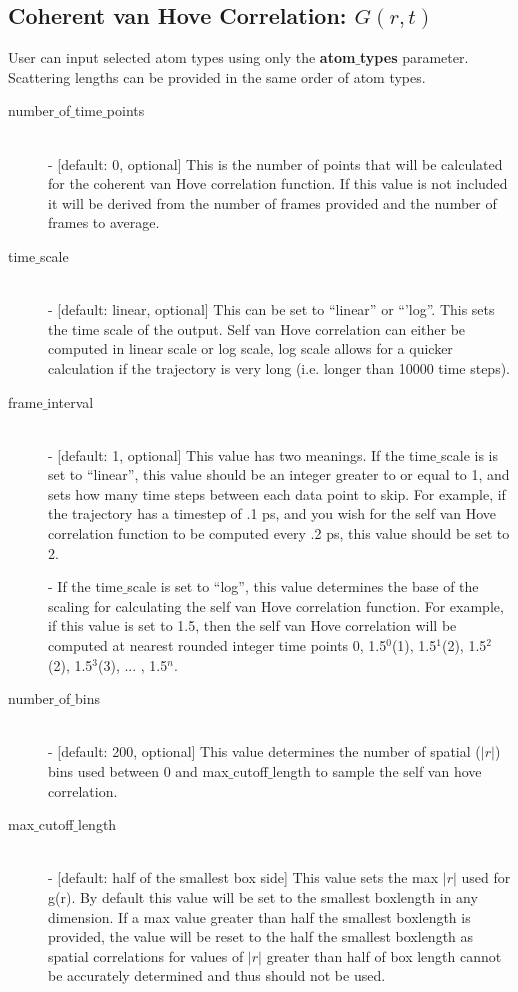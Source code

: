\documentclass{article}
\begin{document}
\subsection{Coherent van Hove Correlation: $G(r,t)$} \label{sec::Grt_parm}
User can input selected atom types using only the \textbf{atom$\_$types} parameter. Scattering lengths can be provided in the same order of atom types.
\begin{description}	
	\item[number$\_$of$\_$time$\_$points]\hfill \\
	- [default: 0, optional] This is the number of points that will be calculated for the coherent van Hove correlation function.  If this value is not included it will be derived from the number of frames provided and the number of frames to average.
	
	\item[time$\_$scale] \hfill \\
	- [default: linear, optional] This can be set to ``linear'' or ``'log''.  This sets the time scale of the output. Self van Hove correlation can either be computed in linear scale or log scale, log scale allows for a quicker calculation if the trajectory is very long (i.e. longer than 10000 time steps).
	
	\item[frame$\_$interval] \hfill \\
	- [default: 1, optional] This value has two meanings.  If the time$\_$scale is is set to ``linear'', this value should be an integer greater to or equal to 1, and sets how many time steps between each data point to skip.  For example, if the trajectory has a timestep of .1 ps, and you wish for the self van Hove correlation function to be computed every .2 ps, this value should be set to 2. 
	
	- If the time$\_$scale is set to ``log'', this value determines the base of the scaling for calculating the self van Hove correlation function.   For example, if this value is set to 1.5, then the self van Hove correlation will be computed at nearest rounded integer time points 0, 1.5$^0$(1), 1.5$^1$(2), 1.5$^2$(2), 1.5$^3$(3), ... , 1.5$^{n}$.
	
	\item[number$\_$of$\_$bins] \hfill \\
	- [default: 200, optional] This value determines the number of spatial ($|r|$) bins used between 0 and max$\_$cutoff$\_$length to sample the self van hove correlation.
	
	\item[max$\_$cutoff$\_$length] \hfill \\
	- [default: half of the smallest box side] This value sets the max $|r|$ used for g(r).  By default this value will be set to the smallest boxlength in any dimension.  If a max value greater than half the smallest boxlength is provided, the value will be reset to the half the smallest boxlength as spatial correlations for values of $|r|$ greater than half of box length cannot be accurately determined and thus should not be used.
\end{description}
\end{document}
